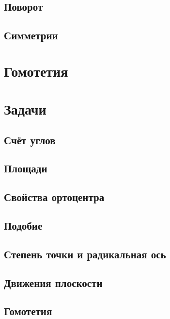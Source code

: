 \documentclass[twoside]{article}
\begin{document}
\subsection{Поворот}
\subsection{Симметрии}

\section{Гомотетия}

\newpage
\renewcommand{\thesubsection}{\roman{subsection}}
\setcounter{subsection}{0}

\section*{Задачи}
\subsection{Счёт углов}

\subsection{Площади}
%
\subsection{Свойства ортоцентра}


\subsection{Подобие}
%
\subsection{Степень точки и радикальная ось}

\subsection{Движения плоскости}
%
\subsection{Гомотетия}
%
%
\end{document}
